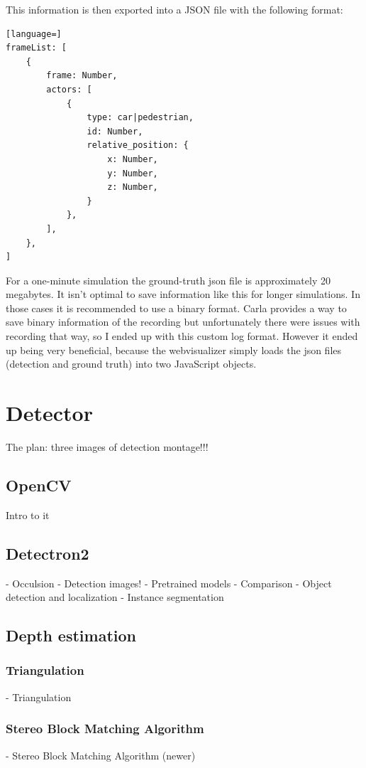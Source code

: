 This information is then exported into a JSON file with the following format:
\begin{lstlisting}[language=]
frameList: [
    {
        frame: Number,
        actors: [
            {
                type: car|pedestrian,
                id: Number,
                relative_position: {
                    x: Number,
                    y: Number,
                    z: Number,
                }
            },
        ],
    },
]
\end{lstlisting}

For a one-minute simulation the ground-truth json file is approximately 20
megabytes. It isn't optimal to save information like this for longer
simulations. In those cases it is recommended to use a binary format. Carla
provides a way to save binary information of the recording but unfortunately
there were issues with recording that way, so I ended up with this custom log
format. However it ended up being very beneficial, because the webvisualizer
simply loads the json files (detection and ground truth) into two JavaScript
objects.

\section{Detector}


The plan: 
three images of detection montage!!!

\subsection{OpenCV}
Intro to it
\subsection{Detectron2}
- Occulsion
- Detection images!
- Pretrained models
- Comparison
- Object detection and localization
- Instance segmentation
\subsection{Depth estimation}
\subsubsection{Triangulation}
- Triangulation
\subsubsection{Stereo Block Matching Algorithm}
- Stereo Block Matching Algorithm (newer)
